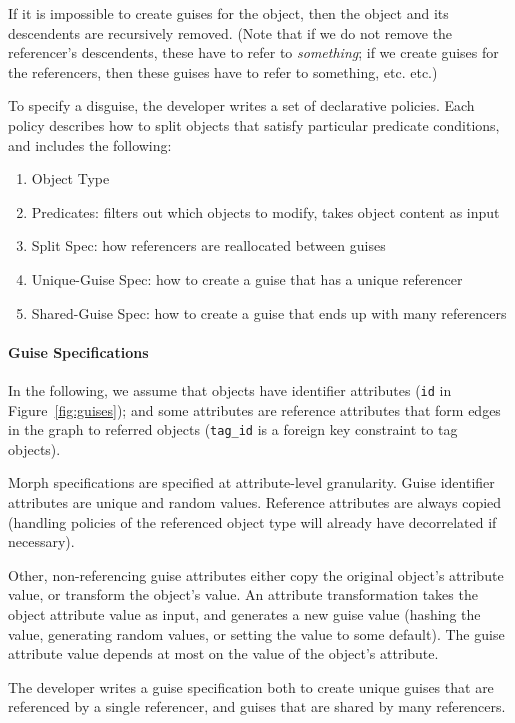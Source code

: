 If it is impossible to create guises for the object, then the object
and its descendents are recursively removed. (Note that if we do not remove the referencer's
descendents, these have to refer to \emph{something}; if we create guises for the referencers, then
these guises have to refer to something, etc. etc.)

To specify a disguise, the developer writes a set of declarative policies. Each policy describes how
to split objects that satisfy particular predicate conditions, and includes the following:
\begin{enumerate}
    \item Object Type
    \item Predicates: filters out which objects to modify, takes object content as input
    \item Split Spec: how referencers are reallocated between guises
    \item Unique-Guise Spec: how to create a guise that has a unique referencer
    \item Shared-Guise Spec: how to create a guise that ends up with many referencers 
\end{enumerate}

\paragraph{Guise Specifications}
In the following, we assume that objects have identifier attributes (\eg \texttt{id} in
Figure~\ref{fig:guises}); and some attributes are reference attributes that form edges in the graph
to referred objects (\eg \texttt{tag\_id} is a foreign key constraint to tag objects).

Morph specifications are specified at attribute-level granularity. Guise identifier attributes are
unique and random values.  Reference attributes are always copied (handling policies of the
referenced object type will already have decorrelated if necessary).

Other, non-referencing guise attributes either copy the original object's attribute value, or
transform the object's value.  An attribute transformation takes the object attribute value as
input, and generates a new guise value (\eg hashing the value, generating random values, or setting
the value to some default).  The guise attribute value depends at most on the value of the object's
attribute.

The developer writes a guise specification both to create unique guises that are referenced by a single
referencer, and guises that are shared by many referencers.

